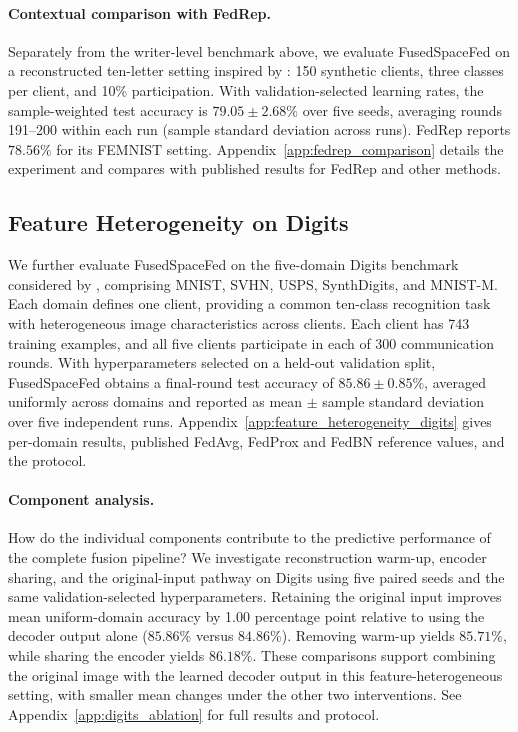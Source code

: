 \documentclass[twoside]{article}
\newif\ifcoauthorreview
\newcommand{\coauthorcolor}{}
\newcommand{\coauthordiffcolor}{\ifcoauthorreview\color[RGB]{0,70,140}\else\color[RGB]{0,0,0}\fi}
\newenvironment{coauthorrevision}{\par\begingroup\coauthorcolor}{\par\endgroup}
\theoremstyle{thmstyleone}%
\theoremstyle{thmstyletwo}%
\theoremstyle{thmstylethree}%
\begin{document}


\begin{coauthorrevision}
\paragraph{Contextual comparison with FedRep.}
Separately from the writer-level benchmark above, we evaluate FusedSpaceFed
on a reconstructed ten-letter setting inspired by
\citet{collins2021fedrep}: 150 synthetic clients, three classes per client,
and 10\% participation. With validation-selected learning rates, the
sample-weighted test accuracy is $79.05\pm2.68\%$ over five seeds, averaging
rounds 191--200 within each run (sample standard deviation across runs).
FedRep reports $78.56\%$ for its FEMNIST setting.
{\coauthordiffcolor Appendix~\ref{app:fedrep_comparison} details the experiment
and compares with published results for FedRep and other methods.}

\subsection{Feature Heterogeneity on Digits}
\label{sec:feature_heterogeneity_digits}

We further evaluate FusedSpaceFed on the five-domain Digits benchmark
considered by \citet{li2021fedbn}, comprising MNIST, SVHN, USPS,
SynthDigits, and MNIST-M. Each domain defines one client, providing a
common ten-class recognition task with heterogeneous image characteristics
across clients. Each client has 743 training examples, and all five clients
participate in each of 300 communication rounds. With hyperparameters
selected on a held-out validation split, FusedSpaceFed obtains a
final-round test accuracy of $85.86\pm0.85\%$, averaged uniformly across
domains and reported as mean $\pm$ sample standard deviation over five
independent runs. Appendix~\ref{app:feature_heterogeneity_digits} gives per-domain results,
published FedAvg, FedProx and FedBN reference values, and the protocol.

\paragraph{Component analysis.}
How do the individual components contribute to the predictive performance
of the complete fusion pipeline? We investigate reconstruction warm-up,
encoder sharing, and the original-input pathway on Digits using five paired
seeds and the same validation-selected hyperparameters. Retaining the
original input improves mean uniform-domain accuracy by 1.00 percentage
point relative to using the decoder output alone ($85.86\%$ versus
$84.86\%$). Removing warm-up yields $85.71\%$, while sharing the encoder
yields $86.18\%$. These comparisons support combining the original image
with the learned decoder output in this feature-heterogeneous setting,
with smaller mean changes under the other two interventions.
See Appendix~\ref{app:digits_ablation} for full results and protocol.


\end{coauthorrevision}
\end{document}
